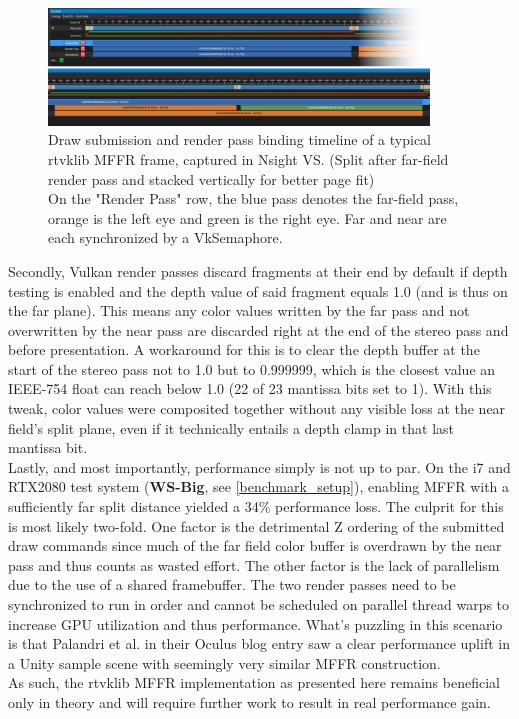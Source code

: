 \begin{figure}[htb]
  \centering
  \includegraphics[width=0.9\textwidth]{pictures/MFFR_timeline_stacked_delimited}
  \caption{Draw submission and render pass binding timeline of a typical \gls{rtvklib} \gls{MFFR} frame, captured in \gls{Nsight VS}. (Split after far-field render pass and stacked vertically for better page fit) \\On the "Render Pass" row, the blue pass denotes the far-field pass, orange is the left eye and green is the right eye. Far and near are each synchronized by a VkSemaphore.} \label{fig:Nsight_MFFR}
\end{figure}

Secondly, Vulkan render passes discard fragments at their end by default if depth testing is enabled and the depth value of said fragment equals 1.0 (and is thus on the far plane). This means any color values written by the far pass and not overwritten by the near pass are discarded right at the end of the stereo pass and before presentation. A workaround for this is to clear the depth buffer at the start of the stereo pass not to 1.0 but to 0.999999, which is the closest value an IEEE-754 float can reach below 1.0 (22 of 23 mantissa bits set to 1). With this tweak, color values were composited together without any visible loss at the near field's split plane, even if it technically entails a depth clamp in that last mantissa bit. \\
Lastly, and most importantly, performance simply is not up to par. On the i7 and RTX2080 test system (\textbf{WS-Big}, see \autoref{benchmark_setup}), enabling \gls{MFFR} with a sufficiently far split distance yielded a 34\% performance loss. The culprit for this is most likely two-fold. One factor is the detrimental Z ordering of the submitted draw commands since much of the far field color buffer is overdrawn by the near pass and thus counts as wasted effort. The other factor is the lack of parallelism due to the use of a shared framebuffer. The two render passes need to be synchronized to run in order and cannot be scheduled on parallel thread warps to increase GPU utilization and thus performance. What's puzzling in this scenario is that Palandri et al. in their Oculus blog entry\cite{Palandri.2016} saw a clear performance uplift in a Unity sample scene with seemingly very similar \gls{MFFR} construction. \\
As such, the \gls{rtvklib} \gls{MFFR} implementation as presented here remains beneficial only in theory and will require further work to result in real performance gain. 

